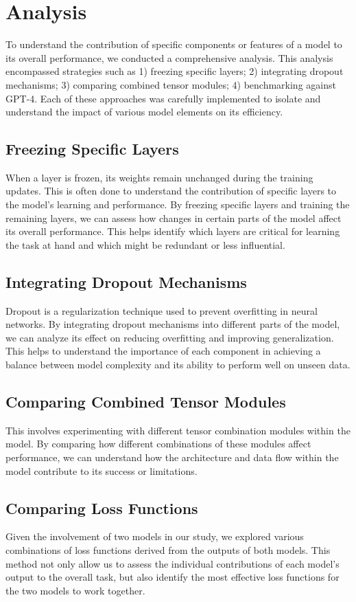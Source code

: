 \section{Analysis}
\label{sec:4_analysis}
To understand the contribution of specific components or features of a model to its overall performance, we conducted a comprehensive analysis. This analysis encompassed strategies such as 1) freezing specific layers; 2) integrating dropout mechanisms; 3) comparing combined tensor modules; 4) benchmarking against GPT-4. Each of these approaches was carefully implemented to isolate and understand the impact of various model elements on its efficiency.

\subsection{Freezing Specific Layers}
\label{subsec:4_freezing_specific_layers}
When a layer is frozen, its weights remain unchanged during the training updates. This is often done to understand the contribution of specific layers to the model's learning and performance. By freezing specific layers and training the remaining layers, we can assess how changes in certain parts of the model affect its overall performance. This helps identify which layers are critical for learning the task at hand and which might be redundant or less influential.
\subsection{Integrating Dropout Mechanisms}
\label{subsec:4_integrating_dropout_mechanisms} 
Dropout is a regularization technique used to prevent overfitting in neural networks. By integrating dropout mechanisms into different parts of the model, we can analyze its effect on reducing overfitting and improving generalization. This helps to understand the importance of each component in achieving a balance between model complexity and its ability to perform well on unseen data.
\subsection{Comparing Combined Tensor Modules}
\label{subsec:4_comparing_combined_tensor_modules}
This involves experimenting with different tensor combination modules within the model. By comparing how different combinations of these modules affect performance, we can understand how the architecture and data flow within the model contribute to its success or limitations.
\subsection{Comparing Loss Functions}
\label{subsec:4_comparing_loss_functions}
Given the involvement of two models in our study, we explored various combinations of loss functions derived from the outputs of both models. This method not only allow us to assess the individual contributions of each model's output to the overall task, but also identify the most effective loss functions for the two models to work together.
